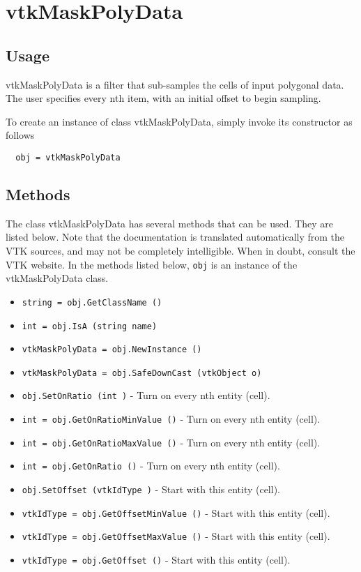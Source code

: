 \section{vtkMaskPolyData}

\subsection{Usage}

 vtkMaskPolyData is a filter that sub-samples the cells of input polygonal
 data. The user specifies every nth item, with an initial offset to begin
 sampling. 

To create an instance of class vtkMaskPolyData, simply
invoke its constructor as follows
\begin{verbatim}
  obj = vtkMaskPolyData
\end{verbatim}
\subsection{Methods}

The class vtkMaskPolyData has several methods that can be used.
  They are listed below.
Note that the documentation is translated automatically from the VTK sources,
and may not be completely intelligible.  When in doubt, consult the VTK website.
In the methods listed below, \verb|obj| is an instance of the vtkMaskPolyData class.
\begin{itemize}
\item  \verb|string = obj.GetClassName ()|

\item  \verb|int = obj.IsA (string name)|

\item  \verb|vtkMaskPolyData = obj.NewInstance ()|

\item  \verb|vtkMaskPolyData = obj.SafeDownCast (vtkObject o)|

\item  \verb|obj.SetOnRatio (int )| -  Turn on every nth entity (cell).

\item  \verb|int = obj.GetOnRatioMinValue ()| -  Turn on every nth entity (cell).

\item  \verb|int = obj.GetOnRatioMaxValue ()| -  Turn on every nth entity (cell).

\item  \verb|int = obj.GetOnRatio ()| -  Turn on every nth entity (cell).

\item  \verb|obj.SetOffset (vtkIdType )| -  Start with this entity (cell).

\item  \verb|vtkIdType = obj.GetOffsetMinValue ()| -  Start with this entity (cell).

\item  \verb|vtkIdType = obj.GetOffsetMaxValue ()| -  Start with this entity (cell).

\item  \verb|vtkIdType = obj.GetOffset ()| -  Start with this entity (cell).

\end{itemize}
